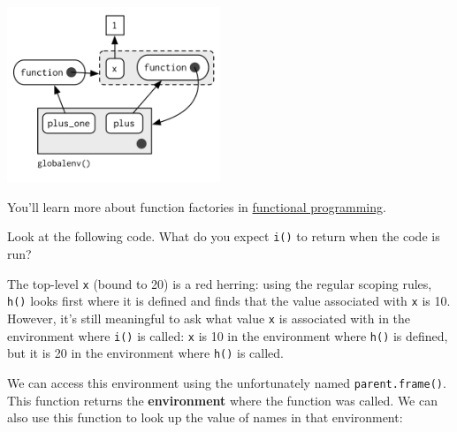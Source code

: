 \includegraphics[width=2.51in]{diagrams/environments.png/closure-2.png}

You'll learn more about function factories in
\hyperref[functional-programming]{functional programming}.


Look at the following code. What do you expect \texttt{i()} to return
when the code is run? 

\begin{Shaded}
\begin{Highlighting}[]
\StringTok{ }
  \StringTok{ }
  \NormalTok{\}}
\NormalTok{\}}
\StringTok{ }\NormalTok{()}
\StringTok{ }
\NormalTok{()}
\end{Highlighting}
\end{Shaded}

The top-level \texttt{x} (bound to 20) is a red herring: using the
regular scoping rules, \texttt{h()} looks first where it is defined and
finds that the value associated with \texttt{x} is 10. However, it's
still meaningful to ask what value \texttt{x} is associated with in the
environment where \texttt{i()} is called: \texttt{x} is 10 in the
environment where \texttt{h()} is defined, but it is 20 in the
environment where \texttt{h()} is called.

We can access this environment using the unfortunately named
\texttt{parent.frame()}. This function returns the \textbf{environment}
where the function was called. We can also use this function to look up
the value of names in that environment:

